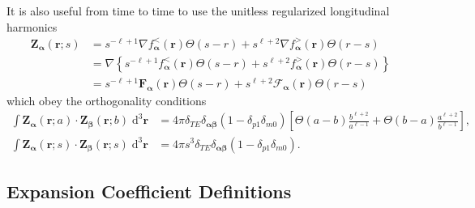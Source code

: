 \documentclass{article}
\begin{document}
It is also useful from time to time to use the unitless regularized longitudinal harmonics
\begin{equation}
\begin{split}
\mathbf{Z}_{\bm{\alpha}}(\mathbf{r};s) &= s^{-\ell + 1}\nabla f_{\bm{\alpha}}^<(\mathbf{r})\Theta(s - r) + s^{\ell + 2}\nabla f_{\bm{\alpha}}^>(\mathbf{r})\Theta(r - s)\\
&= \nabla\left\{s^{-\ell + 1} f_{\bm{\alpha}}^<(\mathbf{r})\Theta(s - r) + s^{\ell + 2} f_{\bm{\alpha}}^>(\mathbf{r})\Theta(r - s)\right\}\\
&= s^{-\ell + 1}\mathbf{F}_{\bm{\alpha}}(\mathbf{r})\Theta(s - r) + s^{\ell + 2}\bm{\mathcal{F}}_{\bm{\alpha}}(\mathbf{r})\Theta(r - s)
\end{split}
\end{equation}
which obey the orthogonality conditions
\begin{equation}
\begin{split}
\int\mathbf{Z}_{\bm{\alpha}}(\mathbf{r};a)\cdot\mathbf{Z}_{\bm{\beta}}(\mathbf{r};b)\;\mathrm{d}^3\mathbf{r} &= 4\pi\delta_{TE}\delta_{\bm{\alpha}\bm{\beta}}(1 - \delta_{p1}\delta_{m0})\left[\Theta(a - b)\frac{b^{\ell + 2}}{a^{\ell - 1}} + \Theta(b - a)\frac{a^{\ell + 2}}{b^{\ell - 1}}\right],\\
\int\mathbf{Z}_{\bm{\alpha}}(\mathbf{r};s)\cdot\mathbf{Z}_{\bm{\beta}}(\mathbf{r};s)\;\mathrm{d}^3\mathbf{r} &= 4\pi s^3\delta_{TE}\delta_{\bm{\alpha}\bm{\beta}}(1 - \delta_{p1}\delta_{m0}).
\end{split}
\end{equation}



\subsection{Expansion Coefficient Definitions}
\end{document}

